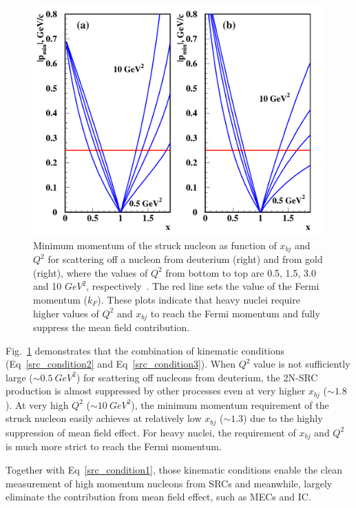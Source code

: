 \begin{figure}[!ht]
  \begin{center}
    \includegraphics[type=pdf,ext=.pdf,read=.pdf,width=0.60\linewidth]{./figures/physics/p_min_x}
    \caption[Minimum momentum of the struck nucleon as function of $x_{bj}$ and $Q^{2}$]{\footnotesize{Minimum momentum of the struck nucleon as function of $x_{bj}$ and $Q^{2}$ for scattering off a nucleon from deuterium (right) and from gold (right), where the values of $Q^{2}$ from bottom to top are 0.5, 1.5, 3.0 and 10 $GeV^{2}$, respectively~\cite{Frankfurt_misak, src_john}. The red line sets the value of the Fermi momentum ($k_{F}$). These plots indicate that heavy nuclei require higher values of $Q^{2}$ and $x_{bj}$ to reach the Fermi momentum and fully suppress the mean field contribution.}}
    \label{kin_cond_q2_xbj}
  \end{center}
\end{figure} 
Fig.~\ref{kin_cond_q2_xbj} demonstrates that the combination of kinematic conditions (Eq~\eqref{src_condition2} and Eq~\eqref{src_condition3}). When $Q^{2}$ value is not sufficiently large ($\sim 0.5~GeV^{2}$) for scattering off nucleons from deuterium, the 2N-SRC production is almost suppressed by other processes even at very higher $x_{bj}$ ($\sim 1.8$). At very high $Q^{2}$ ($\sim 10~GeV^{2}$), the minimum momentum requirement of the struck nucleon easily achieves at relatively low $x_{bj}$ ($\sim 1.3$) due to the highly suppression of mean field effect. For heavy nuclei, the requirement of $x_{bj}$ and $Q^{2}$ is much more strict to reach the Fermi momentum. 

Together with Eq~\eqref{src_condition1}, those kinematic conditions enable the clean measurement of high momentum nucleons from SRCs and meanwhile, largely eliminate the contribution from mean field effect, such as MECs and IC.

